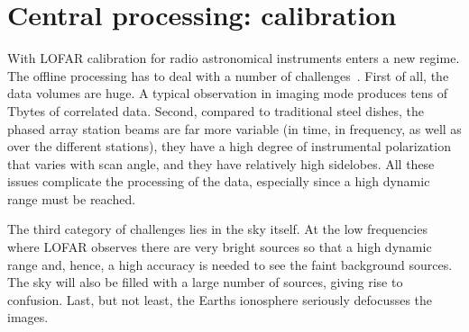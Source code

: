 \documentclass[journal]{IEEEtran}
\begin{document}


\section{Central processing: calibration}

With LOFAR calibration for radio astronomical instruments enters a new regime. The offline processing has to deal with a number of challenges~\cite{Noordam:04,Noordam:06,Nijboer:07}. First of all, the data volumes are huge. A typical observation in imaging mode produces tens of Tbytes of correlated data. Second, compared to traditional steel dishes, the phased array station beams are far more variable (in time, in frequency, as well as over the different stations), they have a high degree of instrumental polarization that varies with scan angle, and they have relatively high sidelobes. All these issues complicate the processing of the data, especially since a high dynamic range must be reached. 

The third category of challenges lies in the sky itself. At the low frequencies where LOFAR observes there are very bright sources so that a high dynamic range and, hence, a high accuracy is needed to see the faint background sources. The sky will also be filled with a large number of sources, giving rise to confusion. Last, but not least, the Earths ionosphere seriously defocusses the images.
\end{document}
